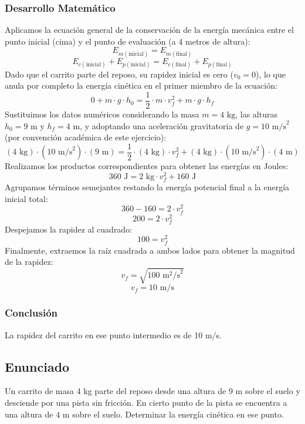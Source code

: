 \documentclass[12pt,a4paper]{article}
\begin{document}
\subsubsection*{Desarrollo Matemático}
Aplicamos la ecuación general de la conservación de la energía mecánica entre el punto inicial (cima) y el punto de evaluación (a 4 metros de altura):
$$E_{m(\text{inicial})} = E_{m(\text{final})}$$
$$E_{c(\text{inicial})} + E_{p(\text{inicial})} = E_{c(\text{final})} + E_{p(\text{final})}$$
Dado que el carrito parte del reposo, su rapidez inicial es cero ($v_0 = 0$), lo que anula por completo la energía cinética en el primer miembro de la ecuación:
$$0 + m \cdot g \cdot h_0 = \frac{1}{2} \cdot m \cdot v_f^2 + m \cdot g \cdot h_f$$
Sustituimos los datos numéricos considerando la masa $m = 4 \text{ kg}$, las alturas $h_0 = 9 \text{ m}$ y $h_f = 4 \text{ m}$, y adoptando una aceleración gravitatoria de $g = 10 \text{ m/s}^2$ (por convención académica de este ejercicio):
$$(4 \text{ kg}) \cdot (10 \text{ m/s}^2) \cdot (9 \text{ m}) = \frac{1}{2} \cdot (4 \text{ kg}) \cdot v_f^2 + (4 \text{ kg}) \cdot (10 \text{ m/s}^2) \cdot (4 \text{ m})$$
Realizamos los productos correspondientes para obtener las energías en Joules:
$$360 \text{ J} = 2 \text{ kg} \cdot v_f^2 + 160 \text{ J}$$
Agrupamos términos semejantes restando la energía potencial final a la energía inicial total:
$$360 - 160 = 2 \cdot v_f^2$$
$$200 = 2 \cdot v_f^2$$
Despejamos la rapidez al cuadrado:
$$100 = v_f^2$$
Finalmente, extraemos la raíz cuadrada a ambos lados para obtener la magnitud de la rapidez:
$$v_f = \sqrt{100 \text{ m}^2\text{/s}^2}$$
$$v_f = 10 \text{ m/s}$$

\subsubsection*{Conclusión}
La rapidez del carrito en ese punto intermedio es de 10 m/s.

\newpage
\subsection*{Enunciado}
Un carrito de masa 4 kg parte del reposo desde una altura de 9 m sobre el suelo y desciende por una pista sin fricción. En cierto punto de la pista se encuentra a una altura de 4 m sobre el suelo. Determinar la energía cinética en ese punto.
\end{document}
